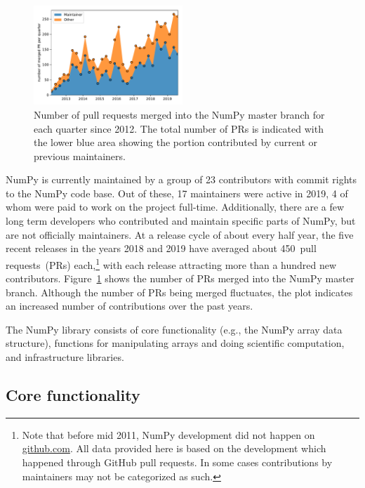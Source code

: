 \begin{figure}
    \centering
    \includegraphics[width=0.5\textwidth]{scripts/PRs-using-CURRENT_MAINTAINERS.pdf}
    \caption{Number of pull requests merged into the NumPy master branch for each
        quarter since 2012. The total number of PRs is indicated with the
        lower blue area showing the portion contributed by current or previous
        maintainers.}\label{fig:prs-over-time}
\end{figure}


NumPy is currently maintained by a group of 23 contributors with commit rights
to the NumPy code base. Out of these, 17 maintainers were active in
2019, 4 of whom were paid to work on the project full-time.
Additionally, there are a few long term developers who contributed and maintain
specific parts of NumPy, but are not officially maintainers.
At a release cycle of about every half year, the five recent releases in the years
2018 and 2019 have averaged about 450~pull requests~(PRs) each,\footnote{
    Note that before mid 2011, NumPy development did not happen on \url{github.com}.
    All data provided here is based on the development which happened through GitHub
    pull requests. In some cases contributions by maintainers may not be categorized as such.}
with each release attracting more than a hundred new contributors.
Figure~\ref{fig:prs-over-time} shows the number of PRs merged into the NumPy
master branch.
Although the number of PRs being merged fluctuates,
the plot indicates an increased number of contributions over the past
years.

The NumPy library consists of core functionality (e.g., the NumPy array data structure),
functions for manipulating arrays and doing scientific computation, and infrastructure
libraries.

\subsection{Core functionality}

